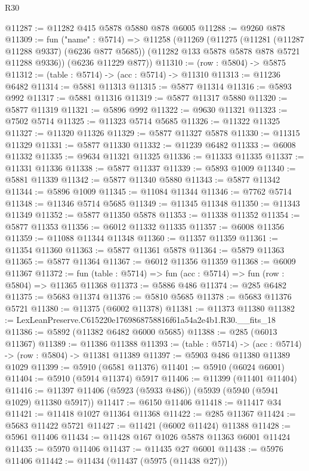 \begin{lexlean}{R30}
\begin{coremodule}
@11287 := @11282 @415 @5878 @5880 @878 @6005
@11288 := @9260 @878
@11309 := fun ("name" : @5714) =>
  @11258
    (@11269
      (@11275
        (@11281 (@11287 @11288 @9337) (@6236 @877 @5685))
        (@11282 @133 @5878 @5878 @878 @5721 @11288 @9336))
      (@6236 @11229 @877))
@11310 := (row : @5804) -> @5875
@11312 := (table : @5714) -> (acc : @5714) -> @11310
@11313 := @11236 @6482
@11314 := @5881 @11313
@11315 := @5877 @11314
@11316 := @5893 @992
@11317 := @5881 @11316
@11319 := @5877 @11317 @5880
@11320 := @5877 @11319
@11321 := @5896 @992
@11322 := @9630 @11321
@11323 := @7502 @5714
@11325 := @11323 @5714 @5685
@11326 := @11322 @11325
@11327 := @11320 @11326
@11329 := @5877 @11327 @5878
@11330 := @11315 @11329
@11331 := @5877 @11330
@11332 := @11239 @6482
@11333 := @6008 @11332
@11335 := @9634 @11321 @11325
@11336 := @11333 @11335
@11337 := @11331 @11336
@11338 := @5877 @11337
@11339 := @5893 @1009
@11340 := @5881 @11339
@11342 := @5877 @11340 @5880
@11343 := @5877 @11342
@11344 := @5896 @1009
@11345 := @11084 @11344
@11346 := @7762 @5714
@11348 := @11346 @5714 @5685
@11349 := @11345 @11348
@11350 := @11343 @11349
@11352 := @5877 @11350 @5878
@11353 := @11338 @11352
@11354 := @5877 @11353
@11356 := @6012 @11332 @11335
@11357 := @6008 @11356
@11359 := @11088 @11344 @11348
@11360 := @11357 @11359
@11361 := @11354 @11360
@11363 := @5877 @11361 @5878
@11364 := @5879 @11363
@11365 := @5877 @11364
@11367 := @6012 @11356 @11359
@11368 := @6009 @11367
@11372 := fun (table : @5714) => fun (acc : @5714) => fun (row : @5804) => @11365 @11368
@11373 := @5886 @486
@11374 := @285 @6482
@11375 := @5683 @11374
@11376 := @5810 @5685
@11378 := @5683 @11376 @5721
@11380 := @11375 (@6002 @11378)
@11381 := @11373 @11380
@11382 := LexLeanPreserve.C615220e1769868758816f61a54a2e4b1.R30.__fits_18
@11386 := @5892 (@11382 @6482 @6000 @5685)
@11388 := @285 (@6013 @11367)
@11389 := @11386 @11388
@11393 := (table : @5714) -> (acc : @5714) -> (row : @5804) -> @11381 @11389
@11397 := @5903 @486 @11380 @11389 @1029
@11399 := @5910 (@6581 @11376)
@11401 := @5910 (@6024 @6001)
@11404 := @5910 (@5914 @11374) @5917
@11406 := @11399 (@11401 @11404)
@11416 := @11397 @11406 (@5923 (@5933 @486)) (@5939 (@5940 (@5941 @1029) @11380 @5917))
@11417 := @6150 @11406
@11418 := @11417 @34
@11421 := @11418 @1027 @11364 @11368
@11422 := @285 @11367
@11424 := @5683 @11422 @5721
@11427 := @11421 (@6002 @11424) @11388
@11428 := @5961 @11406
@11434 := @11428 @167 @1026 @5878 @11363 @6001 @11424
@11435 := @5970 @11406
@11437 := @11435 @27 @6001
@11438 := @5976 @11406
@11442 := @11434 (@11437 (@5975 (@11438 @27)))

\end{coremodule}
\end{lexlean}
